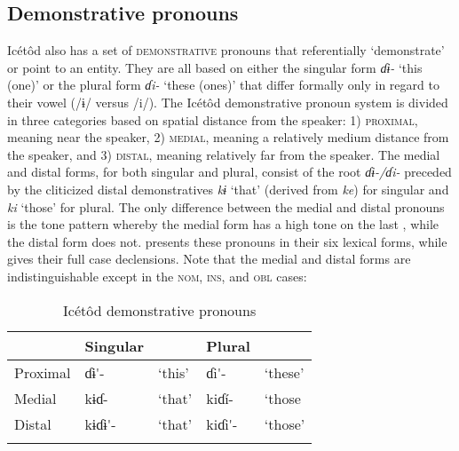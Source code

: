 \subsection{Demonstrative pronouns}\label{sec:5.6}


Icétôd also has a set of \textsc{demonstrative} pronouns that referentially ‘demonstrate’ or point to an entity. They are all based on either the singular form \textit{ɗɨ{}-} ‘this (one)’ or the plural form \textit{ɗi-} ‘these (ones)’ that differ formally only in regard to their vowel (/ɨ/ versus /i/). The Icétôd demonstrative pronoun system is divided in three categories based on spatial distance from the speaker: 1) \textsc{proximal}, meaning near the speaker, 2) \textsc{medial}, meaning a relatively medium distance from the speaker, and 3) \textsc{distal}, meaning relatively far from the speaker. The medial and distal forms, for both singular and plural, consist of the root \textit{ɗɨ{}-/ɗi-} preceded by the cliticized distal demonstratives \textit{kɨ} ‘that’ (derived from \textit{ke}) for singular and \textit{ki} ‘those’ for plural. The only difference between the medial and distal pronouns is the tone pattern whereby the medial form has a high tone on the last , while the distal form does not.  presents these pronouns in their six lexical forms, while  gives their full case declensions. Note that the medial and distal forms are indistinguishable except in the \textsc{nom}, \textsc{ins}, and \textsc{obl} cases:


\begin{table}
\caption{Icétôd demonstrative pronouns}
\label{tab:pro:dem1}


\begin{tabularx}{\textwidth}{XXXXX}
\lsptoprule

& Singular &  & Plural & \\
\midrule
Proximal & ɗɨ\'{}- & ‘this’ & ɗi\'{}- & ‘these’\\
Medial & kɨɗ{\Í}- & ‘that’ & kiɗ\'{i}- & ‘those\\
Distal & kɨɗɨ\'{}- & ‘that’ & kiɗi\'{}- & ‘those’\\
\lspbottomrule
\end{tabularx}
\end{table}

